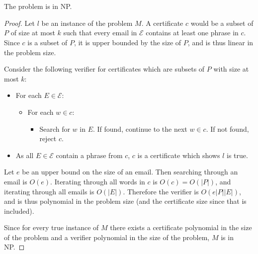 \documentclass[11pt]{article}
\begin{document}
\section{}

The problem is in NP.
\begin{proof}
    Let $l$ be an instance of the problem $M$. A certificate $c$ would be a subset of $P$ of size at most $k$ such that every email in $\mathcal{E}$ contains at least one phrase in $c$. Since $c$ is a subset of $P$, it is upper bounded by the size of $P$, and is thus linear in the problem size.

    Consider the following verifier for certificates which are subsets of $P$ with size at most $k$: \begin{itemize}
        \item For each $E \in \mathcal{E}$:
            \begin{itemize}
                \item For each $w \in c$:
                    \begin{itemize}
                        \item Search for $w$ in $E$. If found, continue to the next $w \in c$. If not found, reject $c$.
                    \end{itemize}
            \end{itemize}
        \item As all $E \in \mathcal{E}$ contain a phrase from $c$, $c$ is a certificate which shows $l$ is true.
    \end{itemize}

    Let $e$ be an upper bound on the size of an email. Then searching through an email is $O(e)$. Iterating through all words in $c$ is $O(c) = O(|P|)$, and iterating through all emails is $O(|E|)$. Therefore the verifier is $O(e|P||E|)$, and is thus polynomial in the problem size (and the certificate size since that is included).

    Since for every true instance of $M$ there exists a certificate polynomial in the size of the problem and a verifier polynomial in the size of the problem, $M$ is in NP.
\end{proof}
\end{document}
